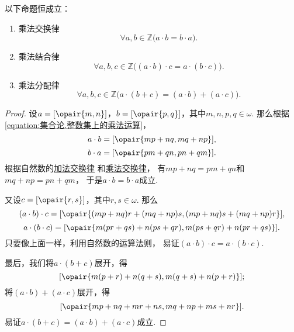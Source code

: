 \begin{theorem}\label{theorem:集合论.整数乘法的运算法则1}
以下命题恒成立：
\begin{enumerate}
	\item 乘法交换律
	\begin{equation}\label{equation:集合论.整数乘法交换律}
		\forall a,b\in\mathbb{Z} \bigl(
			a \cdot b = b \cdot a
		\bigr).
	\end{equation}
	\item 乘法结合律
	\begin{equation}\label{equation:集合论.整数乘法结合律}
		\forall a,b,c\in\mathbb{Z} \bigl(
			(a \cdot b) \cdot c = a \cdot (b \cdot c)
		\bigr).
	\end{equation}
	\item 乘法分配律
	\begin{equation}\label{equation:集合论.整数乘法分配律}
		\forall a,b,c\in\mathbb{Z} \bigl(
			a \cdot (b + c) = (a \cdot b) + (a \cdot c)
		\bigr).
	\end{equation}
\end{enumerate}
\begin{proof}
设\(a=[\opair{m,n}]\)，\(b=[\opair{p,q}]\)，其中\(m,n,p,q\in\omega\).
那么根据\cref{equation:集合论.整数集上的乘法运算}，\[
	a \cdot b = [\opair{mp+nq,mq+np}],
\]\[
	b \cdot a = [\opair{pm+qn,pn+qm}].
\]
根据自然数的\hyperref[equation:集合论.自然数加法交换律]{加法交换律}%
和\hyperref[equation:集合论.自然数乘法交换律]{乘法交换律}，
有\(mp+nq=pm+qn\)和\(mq+np=pn+qm\)，
于是\(a \cdot b = b \cdot a\)成立.

又设\(c=[\opair{r,s}]\)，其中\(r,s\in\omega\).
那么\[
	(a \cdot b) \cdot c
	= [\opair{(mp+nq)r+(mq+np)s,(mp+nq)s+(mq+np)r}],
\]\[
	a \cdot (b \cdot c)
	= [\opair{m(pr+qs)+n(ps+qr),m(ps+qr)+n(pr+qs)}].
\]
只要像上面一样，利用自然数的运算法则，
易证\((a \cdot b) \cdot c = a \cdot (b \cdot c)\).

最后，我们将\(a \cdot (b+c)\)展开，得\[
	[\opair{m(p+r)+n(q+s),m(q+s)+n(p+r)}];
\]
将\((a \cdot b) + (a \cdot c)\)展开，得\[
	[\opair{mp+nq+mr+ns,mq+np+ms+nr}].
\]
易证\(a \cdot (b + c) = (a \cdot b) + (a \cdot c)\)成立.
\end{proof}
\end{theorem}

